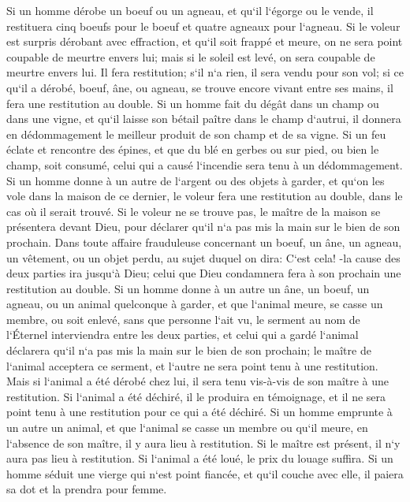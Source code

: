 \verse Si un homme dérobe un boeuf ou un agneau, et qu`il l`égorge ou le vende, il restituera cinq boeufs pour le boeuf et quatre agneaux pour l`agneau. 
\verse Si le voleur est surpris dérobant avec effraction, et qu`il soit frappé et meure, on ne sera point coupable de meurtre envers lui; 
\verse mais si le soleil est levé, on sera coupable de meurtre envers lui. Il fera restitution; s`il n`a rien, il sera vendu pour son vol; 
\verse si ce qu`il a dérobé, boeuf, âne, ou agneau, se trouve encore vivant entre ses mains, il fera une restitution au double. 
\verse Si un homme fait du dégât dans un champ ou dans une vigne, et qu`il laisse son bétail paître dans le champ d`autrui, il donnera en dédommagement le meilleur produit de son champ et de sa vigne. 
\verse Si un feu éclate et rencontre des épines, et que du blé en gerbes ou sur pied, ou bien le champ, soit consumé, celui qui a causé l`incendie sera tenu à un dédommagement. 
\verse Si un homme donne à un autre de l`argent ou des objets à garder, et qu`on les vole dans la maison de ce dernier, le voleur fera une restitution au double, dans le cas où il serait trouvé. 
\verse Si le voleur ne se trouve pas, le maître de la maison se présentera devant Dieu, pour déclarer qu`il n`a pas mis la main sur le bien de son prochain. 
\verse Dans toute affaire frauduleuse concernant un boeuf, un âne, un agneau, un vêtement, ou un objet perdu, au sujet duquel on dira: C`est cela! -la cause des deux parties ira jusqu`à Dieu; celui que Dieu condamnera fera à son prochain une restitution au double. 
\verse Si un homme donne à un autre un âne, un boeuf, un agneau, ou un animal quelconque à garder, et que l`animal meure, se casse un membre, ou soit enlevé, sans que personne l`ait vu, 
\verse le serment au nom de l`Éternel interviendra entre les deux parties, et celui qui a gardé l`animal déclarera qu`il n`a pas mis la main sur le bien de son prochain; le maître de l`animal acceptera ce serment, et l`autre ne sera point tenu à une restitution. 
\verse Mais si l`animal a été dérobé chez lui, il sera tenu vis-à-vis de son maître à une restitution. 
\verse Si l`animal a été déchiré, il le produira en témoignage, et il ne sera point tenu à une restitution pour ce qui a été déchiré. 
\verse Si un homme emprunte à un autre un animal, et que l`animal se casse un membre ou qu`il meure, en l`absence de son maître, il y aura lieu à restitution. 
\verse Si le maître est présent, il n`y aura pas lieu à restitution. Si l`animal a été loué, le prix du louage suffira. 
\verse Si un homme séduit une vierge qui n`est point fiancée, et qu`il couche avec elle, il paiera sa dot et la prendra pour femme. 

